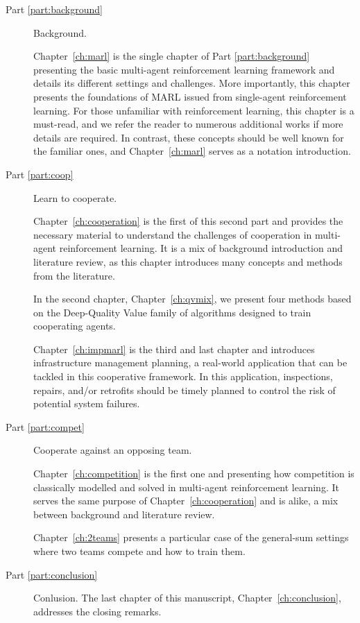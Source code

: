 \begin{description}
    \item [Part \ref{part:background}] Background.
    
    Chapter~\ref{ch:marl} is the single chapter of Part \ref{part:background} presenting the basic multi-agent reinforcement learning framework and details its different settings and challenges.
    More importantly, this chapter presents the foundations of MARL issued from single-agent reinforcement learning.
    For those unfamiliar with reinforcement learning, this chapter is a must-read, and we refer the reader to numerous additional works if more details are required.
    In contrast, these concepts should be well known for the familiar ones, and Chapter~\ref{ch:marl} serves as a notation introduction.

    \item [Part \ref{part:coop}] Learn to cooperate.
    
    Chapter~\ref{ch:cooperation} is the first of this second part and provides the necessary material to understand the challenges of cooperation in multi-agent reinforcement learning.
    It is a mix of background introduction and literature review, as this chapter introduces many concepts and methods from the literature.
    
    In the second chapter, Chapter~\ref{ch:qvmix}, we present four methods based on the Deep-Quality Value family of algorithms designed to train cooperating agents.
    
    Chapter~\ref{ch:impmarl} is the third and last chapter and introduces infrastructure management planning, a real-world application that can be tackled in this cooperative framework.
    In this application, inspections, repairs, and/or retrofits should be timely planned to control the risk of potential system failures.
    
    \item [Part \ref{part:compet}]  Cooperate against an opposing team.
    
    Chapter~\ref{ch:competition} is the first one and presenting how competition is classically modelled and solved in multi-agent reinforcement learning.
    It serves the same purpose of Chapter~\ref{ch:cooperation} and is alike, a mix between background and literature review.
    
    Chapter~\ref{ch:2teams} presents a particular case of the general-sum settings where two teams compete and how to train them.

    \item [Part \ref{part:conclusion}] Conlusion.
    The last chapter of this manuscript, Chapter~\ref{ch:conclusion}, addresses the closing remarks.
\end{description}

